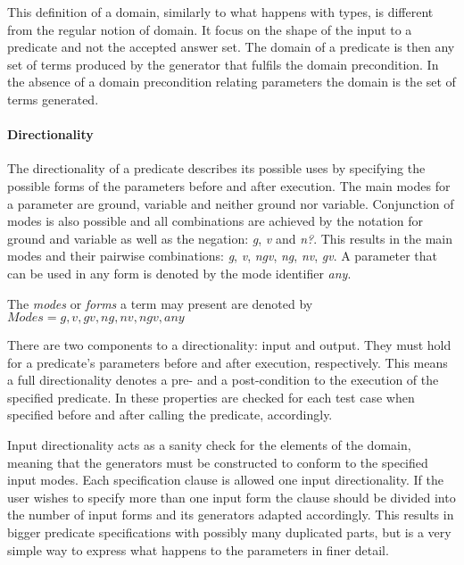 This definition of a domain, similarly to what happens with types, is
different from the regular notion of domain.
%
It focus on the shape of the input to a predicate and not the accepted
answer set.
%
The \plqc{} domain of a predicate is then any set of terms produced by
the generator that fulfils the domain precondition.
%
In the absence of a domain precondition relating parameters the domain
is the set of terms generated.


\paragraph{\bf Directionality}

The directionality of a predicate describes its possible uses by
specifying the possible forms of the parameters before and after
execution.
%
The main modes for a parameter are ground, variable and neither ground
nor variable.
%
Conjunction of modes is also possible and all combinations are achieved
by the notation for ground and variable as well as the negation:
\emph{g}, \emph{v} and \emph{n?}.
%
This results in the main modes and their pairwise combinations: \emph{g},
\emph{v}, \emph{ngv},  \emph{ng}, \emph{nv}, \emph{gv}.
%
A parameter that can be used in any form is denoted by the mode
identifier \emph{any}.


\begin{definition}
\label{def:modes}
The \emph{modes} or \emph{forms} a term may present are denoted by\\
 $Modes = {g, v, gv, ng, nv, ngv, any}$
\end{definition}


There are two components to a directionality: input and output.
%
They must hold for a predicate's parameters before and after execution,
respectively.
%
This means a full directionality denotes a pre- and a post-condition to
the execution of the specified predicate.
%
In \plqc{} these properties are checked for each test case when
specified before and after calling the predicate, accordingly.


Input directionality acts as a sanity check for the elements of the
domain, meaning that the generators must be constructed to conform to the
specified input modes.
%
Each specification clause is allowed one input directionality.
%
If the user wishes to specify more than one input form the clause should
be divided into the number of input forms and its generators adapted
accordingly.
%
This results in bigger predicate specifications with possibly many
duplicated parts, but is a very simple way to express what happens to the
parameters in finer detail.



